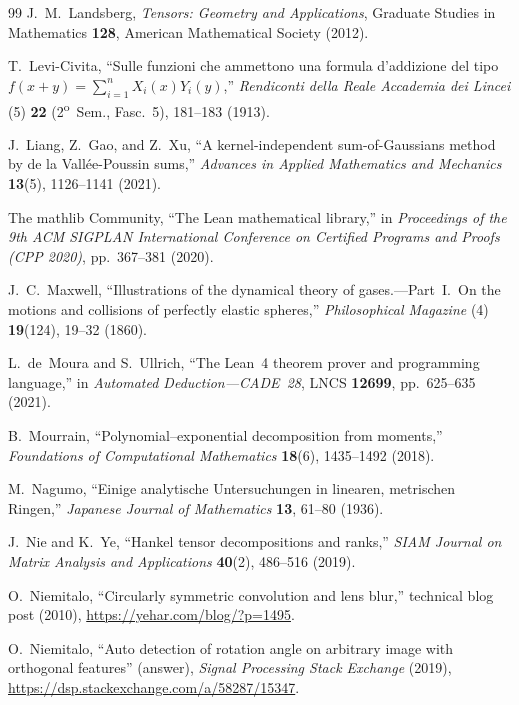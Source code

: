 \documentclass[11pt,a4paper]{article}
\theoremstyle{plain}
\theoremstyle{definition}
\begin{document}
\begin{thebibliography}{99}
J.~M.~Landsberg,
\emph{Tensors: Geometry and Applications},
Graduate Studies in Mathematics \textbf{128}, American Mathematical Society (2012).

T.~Levi-Civita,
``Sulle funzioni che ammettono una formula d'addizione del tipo $f(x+y)=\sum_{i=1}^n X_i(x)Y_i(y)$,''
\emph{Rendiconti della Reale Accademia dei Lincei} (5) \textbf{22} (2\textsuperscript{o}~Sem., Fasc.~5), 181--183 (1913).

J.~Liang, Z.~Gao, and Z.~Xu,
``A kernel-independent sum-of-Gaussians method by de la Vall\'ee-Poussin sums,''
\emph{Advances in Applied Mathematics and Mechanics} \textbf{13}(5), 1126--1141 (2021).

The mathlib Community,
``The Lean mathematical library,''
in \emph{Proceedings of the 9th ACM SIGPLAN International Conference on Certified Programs and Proofs (CPP 2020)}, pp.~367--381 (2020).

J.~C.~Maxwell,
``Illustrations of the dynamical theory of gases.---Part~I.\ On the motions and collisions of perfectly elastic spheres,''
\emph{Philosophical Magazine} (4) \textbf{19}(124), 19--32 (1860).

L.~de~Moura and S.~Ullrich,
``The Lean~4 theorem prover and programming language,''
in \emph{Automated Deduction---CADE~28}, LNCS \textbf{12699}, pp.~625--635 (2021).

B.~Mourrain,
``Polynomial--exponential decomposition from moments,''
\emph{Foundations of Computational Mathematics} \textbf{18}(6), 1435--1492 (2018).

M.~Nagumo,
``Einige analytische Untersuchungen in linearen, metrischen Ringen,''
\emph{Japanese Journal of Mathematics} \textbf{13}, 61--80 (1936).

J.~Nie and K.~Ye,
``Hankel tensor decompositions and ranks,''
\emph{SIAM Journal on Matrix Analysis and Applications} \textbf{40}(2), 486--516 (2019).

O.~Niemitalo,
``Circularly symmetric convolution and lens blur,''
technical blog post (2010),
\url{https://yehar.com/blog/?p=1495}.

O.~Niemitalo,
``Auto detection of rotation angle on arbitrary image with orthogonal features'' (answer),
\emph{Signal Processing Stack Exchange} (2019),
\url{https://dsp.stackexchange.com/a/58287/15347}.


\end{thebibliography}
\end{document}
